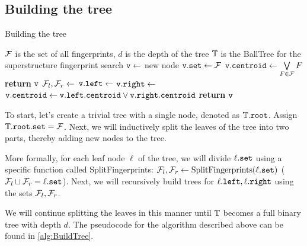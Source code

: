 \subsection{Building the tree}

\begin{algorithm}
  \caption{Building the tree} \label{alg:BuildTree}
  \begin{algorithmic}[1]
    \Require $\mathcal{F}$ is the set of all fingerprints, $d$ is the depth of the tree
    \Ensure $\mathbb{T} $ is the BallTree for the superstructure fingerprint search 
      \State ${\tt v} \gets$ new node
	\State ${\tt v.set} \gets \mathcal{F}$ 
	\State ${\tt v.centroid} \gets \bigvee\limits_{F \in \mathcal{F}} F$ 
	\State \textbf{return} ${\tt v}$ 
      \Else 
        \State $\mathcal{F}_l, \mathcal{F}_r \gets $ 
        \State ${\tt v.left} \gets $  
	\State ${\tt v.right} \gets $ 
	\State ${\tt v.centroid} \gets {\tt v.left.centroid} \lor {\tt v.right.centroid}$ 
        \State \textbf{return} ${\tt v}$ 
      \EndIf
    \EndProcedure
  \end{algorithmic}
\end{algorithm}

To start, let's create a trivial tree with a single node, denoted as $\mathbb{T}.{\tt root}$. Assign $\mathbb{T}.{\tt root.set} = \mathcal{F}$. Next, we will inductively split the leaves of the tree into two parts, thereby adding new nodes to the tree.

More formally, for each leaf node $\ell$ of the tree, we will divide $\ell.{\tt set}$ using a specific function called SplitFingerprints: $\mathcal{F}_l, \mathcal{F}_r \gets \text{SplitFingerprints}(\ell.{\tt set})$ ($\mathcal{F}_l \sqcup \mathcal{F}_r = \ell.{\tt set}$).
Next, we will recursively build trees for $\ell.{\tt left}, \ell.{\tt right}$ using the sets $\mathcal{F}_l, \mathcal{F}_r$.

We will continue splitting the leaves in this manner until $\mathbb{T}$ becomes a full binary tree with depth $d$. The pseudocode for the algorithm described above can be found in \ref{alg:BuildTree}.
 

